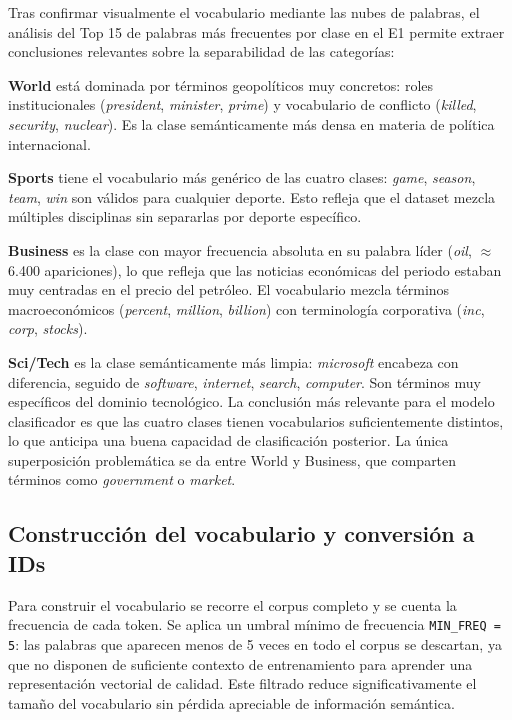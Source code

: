 \documentclass{article}
\begin{document}
Tras confirmar visualmente el vocabulario mediante las nubes de palabras, el análisis
del Top 15 de palabras más frecuentes por clase en el E1 permite extraer conclusiones
relevantes sobre la separabilidad de las categorías:

\textbf{World} está dominada por términos geopolíticos muy concretos: roles institucionales
(\textit{president}, \textit{minister}, \textit{prime}) y vocabulario de conflicto
(\textit{killed}, \textit{security}, \textit{nuclear}). Es la clase semánticamente más
densa en materia de política internacional.

\textbf{Sports} tiene el vocabulario más genérico de las cuatro clases: \textit{game},
\textit{season}, \textit{team}, \textit{win} son válidos para cualquier deporte. Esto
refleja que el dataset mezcla múltiples disciplinas sin separarlas por deporte específico.

\textbf{Business} es la clase con mayor frecuencia absoluta en su palabra líder (\textit{oil},
$\approx$ 6.400 apariciones), lo que refleja que las noticias económicas del periodo estaban
muy centradas en el precio del petróleo. El vocabulario mezcla términos macroeconómicos
(\textit{percent}, \textit{million}, \textit{billion}) con terminología corporativa
(\textit{inc}, \textit{corp}, \textit{stocks}).

\textbf{Sci/Tech} es la clase semánticamente más limpia: \textit{microsoft} encabeza con
diferencia, seguido de \textit{software}, \textit{internet}, \textit{search},
\textit{computer}. Son términos muy específicos del dominio tecnológico.
\newpage
La conclusión más relevante para el modelo clasificador es que las cuatro clases tienen
vocabularios suficientemente distintos, lo que anticipa una buena capacidad de clasificación
posterior. La única superposición problemática se da entre World y Business, que comparten
términos como \textit{government} o \textit{market}.

\subsection{Construcción del vocabulario y conversión a IDs}

Para construir el vocabulario se recorre el corpus completo y se cuenta la frecuencia de
cada token. Se aplica un umbral mínimo de frecuencia \texttt{MIN\_FREQ = 5}: las palabras
que aparecen menos de 5 veces en todo el corpus se descartan, ya que no disponen de
suficiente contexto de entrenamiento para aprender una representación vectorial de calidad.
Este filtrado reduce significativamente el tamaño del vocabulario sin pérdida apreciable de
información semántica.
\end{document}
